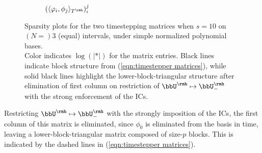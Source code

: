 \begin{example}
\begin{figure}[!ht]
\begin{subfigure}{0.5\textwidth}
                \caption{$(\langle\varphi_{i}, \phi_{j}\rangle_{T^{\rmh}})^{j}_{i}$}
            \end{subfigure}
            \caption{Sparsity plots for the two timestepping matrices when $s  =  10$ on $(N  =)  3$ (equal) intervals, under simple normalized polynomial bases. \\ Color indicates $\log(|*|)$ for the matrix entries. Black lines indicate block structure from (\ref{eqn:timestepper matrices}), while solid black lines highlight the lower-block-triangular structure after elimination of first column on restriction of $\bbU^{\rmh}  \mapsto  \bbU^{\rmh}_{-}$ with the strong enforcement of the ICs.}
            \label{fig:timestepper matrices}
        \end{figure}
        
        Restricting $\bbU^{\rmh}  \mapsto  \bbU^{\rmh}_{-}$ with the strongly imposition of the ICs, the first column of this matrix is eliminated, since $\phi_{0}$ is eliminated from the basis in time, leaving a lower-block-triangular matrix composed of size-$p$ blocks. This is indicated by the dashed lines in (\ref{eqn:timestepper matrices}). 
        

\end{example}
